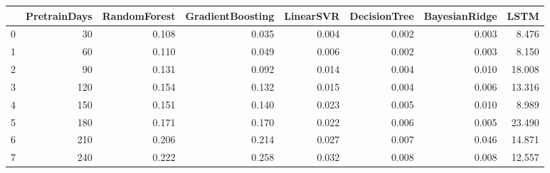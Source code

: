 \begin{tabular}{lrrrrrrr}
\toprule
{} &  PretrainDays &  RandomForest &  GradientBoosting &  LinearSVR &  DecisionTree &  BayesianRidge &   LSTM \\
\midrule
0 &            30 &         0.108 &             0.035 &      0.004 &         0.002 &          0.003 &  8.476 \\
1 &            60 &         0.110 &             0.049 &      0.006 &         0.002 &          0.003 &  8.150 \\
2 &            90 &         0.131 &             0.092 &      0.014 &         0.004 &          0.010 & 18.008 \\
3 &           120 &         0.154 &             0.132 &      0.015 &         0.004 &          0.006 & 13.316 \\
4 &           150 &         0.151 &             0.140 &      0.023 &         0.005 &          0.010 &  8.989 \\
5 &           180 &         0.171 &             0.170 &      0.022 &         0.006 &          0.005 & 23.490 \\
6 &           210 &         0.206 &             0.214 &      0.027 &         0.007 &          0.046 & 14.871 \\
7 &           240 &         0.222 &             0.258 &      0.032 &         0.008 &          0.008 & 12.557 \\
\bottomrule
\end{tabular}
